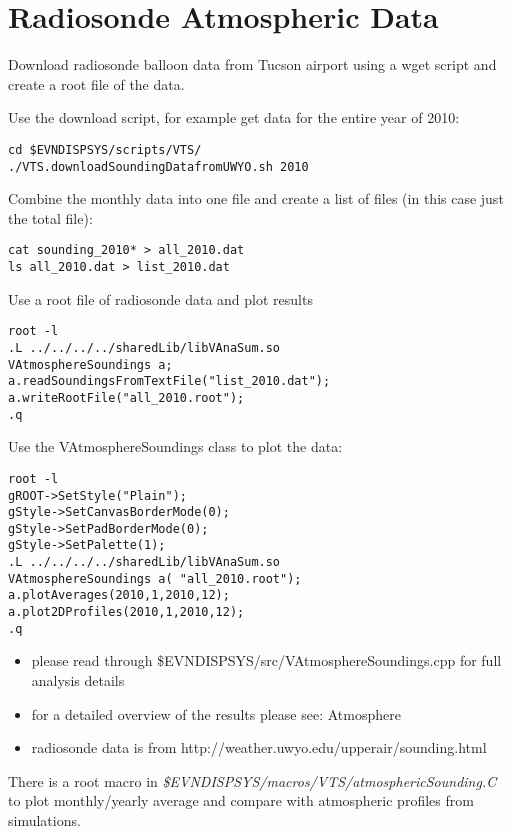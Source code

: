 \documentclass[titlepage,a4paper,twoside,11pt]{report}
\begin{document}
\section{Radiosonde Atmospheric Data}

Download radiosonde balloon data from Tucson airport using a wget script and create a root file of the data.

Use the download script, for example get data for the entire year of 2010: 

\begin{lstlisting}
cd $EVNDISPSYS/scripts/VTS/
./VTS.downloadSoundingDatafromUWYO.sh 2010
\end{lstlisting}

Combine the monthly data into one file and create a list of files (in this case just the total file): 

\begin{lstlisting}
cat sounding_2010* > all_2010.dat
ls all_2010.dat > list_2010.dat
\end{lstlisting}

Use a root file of radiosonde data and plot results 

\begin{lstlisting}
root -l
.L ../../../../sharedLib/libVAnaSum.so 
VAtmosphereSoundings a;
a.readSoundingsFromTextFile("list_2010.dat");
a.writeRootFile("all_2010.root");
.q
\end{lstlisting}

Use the VAtmosphereSoundings class to plot the data: 

\begin{lstlisting}
root -l
gROOT->SetStyle("Plain");
gStyle->SetCanvasBorderMode(0);
gStyle->SetPadBorderMode(0);
gStyle->SetPalette(1); 
.L ../../../../sharedLib/libVAnaSum.so 
VAtmosphereSoundings a( "all_2010.root"); 
a.plotAverages(2010,1,2010,12);
a.plot2DProfiles(2010,1,2010,12);
.q
\end{lstlisting}

\begin{itemize}
\item please read through \$EVNDISPSYS/src/VAtmosphereSoundings.cpp for full analysis details 
\item for a detailed overview of the results please see: Atmosphere 
\item radiosonde data is from http://weather.uwyo.edu/upperair/sounding.html 
\end{itemize}

There is a root macro in {\it \$EVNDISPSYS/macros/VTS/atmosphericSounding.C} to plot monthly/yearly average and compare 
with atmospheric profiles from simulations.
\end{document}
